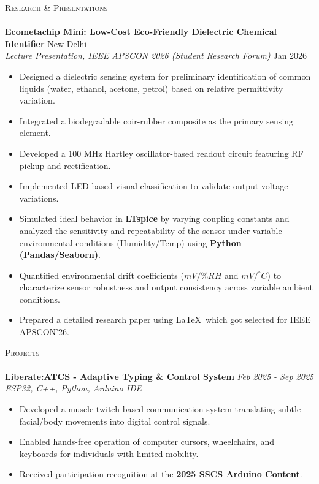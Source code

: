 \documentclass[a4paper]{article}
\newcommand{\lineunder} {
    \vspace*{-8pt} \\
    \hspace*{-18pt} \hrulefill \\
}
\newcommand{\header} [1] {
    {\hspace*{-18pt}\vspace*{6pt} \textsc{#1}}
    \vspace*{-6pt} \lineunder
}
\begin{document}
\header{Research \& Presentations}
\textbf{Ecometachip Mini: Low-Cost Eco-Friendly Dielectric Chemical Identifier} \hfill New Delhi\\
\textit{Lecture Presentation, IEEE APSCON 2026 (Student Research Forum)} \hfill Jan 2026\\
\begin{itemize} \itemsep 1pt
    \item Designed a dielectric sensing system for preliminary identification of common liquids (water, ethanol, acetone, petrol) based on relative permittivity variation.
    \item Integrated a biodegradable coir-rubber composite as the primary sensing element.
    \item Developed a 100 MHz Hartley oscillator-based readout circuit featuring RF pickup and rectification.
    \item Implemented LED-based visual classification to validate output voltage variations.
    \item Simulated ideal behavior in \textbf{LTspice} by varying coupling constants and analyzed the sensitivity and repeatability of the sensor under variable environmental conditions (Humidity/Temp) using \textbf{Python (Pandas/Seaborn)}.
    \item Quantified environmental drift coefficients ($mV/\%RH$ and $mV/^\circ C$) to characterize sensor robustness and output consistency across variable ambient conditions.
    \item Prepared a detailed research paper using \LaTeX\ which got selected for IEEE APSCON'26.
\end{itemize}
\vspace*{4mm}

\header{Projects}

\textbf{Liberate:ATCS - Adaptive Typing \& Control System} \hfill \textit{Feb 2025 - Sep 2025}\\
{\sl ESP32, C++, Python, Arduino IDE}
\begin{itemize} \itemsep 1pt
    \item Developed a muscle-twitch-based communication system translating subtle facial/body movements into digital control signals.
    \item Enabled hands-free operation of computer cursors, wheelchairs, and keyboards for individuals with limited mobility.
    \item Received participation recognition at the \textbf{2025 SSCS Arduino Content}.
\end{itemize}
\vspace*{1mm}
\end{document}
